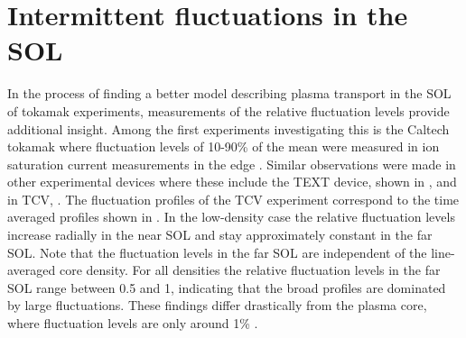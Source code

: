 \section{Intermittent fluctuations in the SOL}
In the process of finding a better model describing plasma transport in the SOL of tokamak experiments, measurements of the relative fluctuation levels provide additional insight. Among the first experiments investigating this is the Caltech tokamak where fluctuation levels of 10-90\% of the mean were measured in ion saturation current measurements in the edge \cite{zweben1982edge,zweben1983scaling}. Similar observations were made in other experimental devices where these include the TEXT device, shown in , and in TCV, . The fluctuation profiles of the TCV experiment correspond to the time averaged profiles shown in . In the low-density case the relative fluctuation levels increase radially in the near SOL and stay approximately constant in the far SOL. Note that the fluctuation levels in the far SOL are independent of the line-averaged core density. For all densities the relative fluctuation levels in the far SOL range between 0.5 and 1, indicating that the broad profiles are dominated by large fluctuations. These findings differ drastically from the plasma core, where fluctuation levels are only around 1\% \cite{mckee2007plasma}. 
